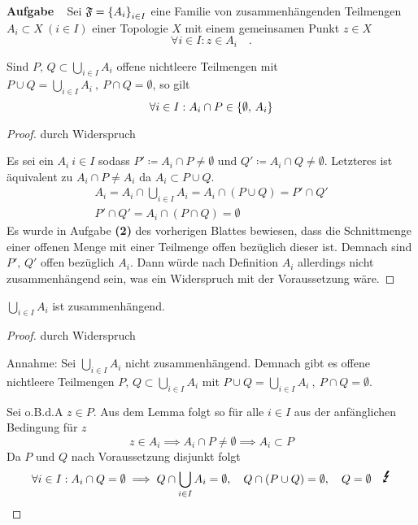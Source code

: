 \documentclass[a4paper, 12pt]{scrartcl}
\newcounter{taski}
\newcommand{\task}{\stepcounter{taski}\textbf{Aufgabe \arabic{taski}}~}
\begin{document}
\setcounter{taski}{2}
\task
Sei $\mathfrak{F} = \qty{A_i}_{i \in I}$ eine Familie von zusammenhängenden Teilmengen $A_i \subset X ~(i \in I)$ einer Topologie $X$ mit einem gemeinsamen Punkt $z \in X$
\[ \forall i \in I: z \in A_i \quad. \]
\begin{lemma}
    Sind $P,\,Q \subset \bigcup_{i \in I} A_i$ offene nichtleere Teilmengen mit $P \cup Q = \bigcup_{i \in I} A_i ~,~ P \cap Q = \emptyset$, so gilt
    \[ \forall i \in I: A_i \cap P \in \qty{\emptyset,\,A_i} \]
\end{lemma}
\begin{proof} durch Widerspruch

Es sei ein $A_i ~ i \in I$ sodass $P' \coloneqq A_i \cap P \neq \emptyset$ und $Q' \coloneqq A_i \cap Q \neq \emptyset$. Letzteres ist äquivalent zu $A_i \cap P \neq A_i$ da $A_i \subset P \cup Q$.
\begin{gather*}
    A_i = A_i \cap \bigcup_{i \in I} A_i = A_i \cap (P \cup Q) = P' \cap Q' \\
    P' \cap Q' = A_i \cap (P \cap Q) = \emptyset
\end{gather*}
Es wurde in Aufgabe \textbf{(2)} des vorherigen Blattes bewiesen, dass die Schnittmenge einer offenen Menge mit einer Teilmenge offen bezüglich dieser ist. Demnach sind $P',\,Q'$ offen bezüglich $A_i$. Dann würde nach Definition $A_i$ allerdings nicht zusammenhängend sein, was ein Widerspruch mit der Voraussetzung wäre.
\end{proof}
\begin{theorem}
    $\bigcup_{i \in I} A_i$ ist zusammenhängend.
\end{theorem}
\begin{proof} durch Widerspruch

Annahme: Sei $\bigcup_{i \in I} A_i$ nicht zusammenhängend. Demnach gibt es offene nichtleere Teilmengen $P,\,Q \subset \bigcup_{i \in I} A_i$ mit $P \cup Q = \bigcup_{i \in I} A_i ~,~ P \cap Q = \emptyset$.

Sei o.B.d.A $z \in P$. Aus dem Lemma folgt so für alle $i \in I$ aus der anfänglichen Bedingung für $z$
\[ z \in A_i \implies A_i \cap P \neq \emptyset \implies A_i \subset P \]
Da $P$ und $Q$ nach Voraussetzung disjunkt folgt
\[ \forall i \in I: A_i \cap Q = \emptyset \implies Q \cap \bigcup_{i \in I} A_i = \emptyset\qc Q \cap (P \cup Q) = \emptyset \qc Q = \emptyset \quad \text{\Large\Lightning} \]
\end{proof}
\end{document}
